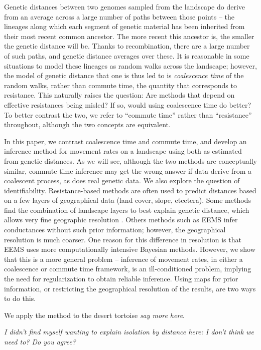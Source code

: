 \documentclass{article}
\newcommand{\plr}[1]{{\em \color{blue} #1}}
\begin{document}
Genetic distances between two genomes sampled from the landscape
do derive from an average across a large number of paths between those points --
the lineages along which each segment of genetic material has been inherited
from their most recent common ancestor.
The more recent this ancestor is,
the smaller the genetic distance will be.
Thanks to recombination, there are a large number of such paths, 
and genetic distance averages over these.
It is reasonable in some situations to model these lineages as random walks across the landscape;
however, the model of genetic distance that one is thus led to
is \emph{coalescence time} of the random walks, 
rather than commute time, the quantity that corresponds to resistance.
This naturally raises the question: 
Are methods that depend on effective resistances being misled?
If so, would using coalescence time do better?
To better contrast the two,
we refer to ``commute time'' rather than ``resistance'' throughout,
although the two concepts are equivalent.

In this paper, we contrast 
coalescence time and commute time,
and develop an inference method for movement rates on a landscape
using both as estimated from genetic distances.
As we will see,
although the two methods are conceptually similar,
commute time inference may get the wrong answer if data derive from a coalescent process,
as does real genetic data.
We also explore the question of identifiability.
Resistance-based methods are often used to predict distances based on a few layers of geographical data
(land cover, slope, etcetera).
Some methods find the combination of landscape layers to best explain genetic distance,
which allows very fine geographic resolution \citep{infer_resistance}.
Others methods such as EEMS \citep{eems} infer conductances without such prior information;
however, the geographical resolution is much coarser.
One reason for this difference in resolution
is that EEMS uses more computationally intensive Bayesian methods.
However, we show that this is a more general problem --
inference of movement rates, in either a coalescence or commute time framework,
is an ill-conditioned problem,
implying the need for regularization to obtain reliable inference.
Using maps for prior information, or restricting the geographical resolution of the results,
are two ways to do this.

We apply the method to the desert tortoise \plr{say more here}.

\plr{I didn't find myself wanting to explain isolation by distance here:
    I don't think we need to? Do you agree?}
\end{document}
